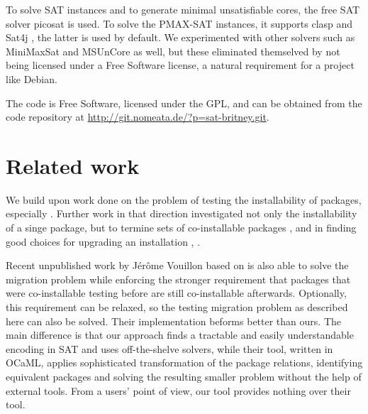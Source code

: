 \documentclass[halfparskip,11pt]{scrartcl}
\begin{document}
To solve SAT instances and to generate minimal unsatisfiable cores, the free SAT solver picosat \cite{picosat} is used. To solve the PMAX-SAT instances, it supports clasp \cite{clasp} and Sat4j \cite{sat4j}, the latter is used by default. We experimented with other solvers such as MiniMaxSat and MSUnCore as well, but these eliminated themselved by not being licensed under a Free Software license, a natural requirement for a project like Debian.


The code is Free Software, licensed under the GPL, and can be obtained from the code repository at \url{http://git.nomeata.de/?p=sat-britney.git}.

\section{Related work}

We build upon work done on the problem of testing the installability of packages, especially \cite{edos}. Further work in that direction investigated not only the installability of a singe package, but to termine sets of co-installable packages \cite{coinst}, and in finding good choices for upgrading an installation \cite{upgrade}, \cite{apt-pbo}.

Recent unpublished work by Jérôme Vouillon based on \cite{coinst} is also able to solve the migration problem while enforcing the stronger requirement that packages that were co-installable testing before are still co-installable afterwards. Optionally, this requirement can be relaxed, so the testing migration problem as described here can also be solved. Their implementation beforms better than ours. The main difference is that our approach finds a tractable and easily understandable encoding in SAT and uses off-the-shelve solvers, while their tool, written in OCaML, applies sophisticated transformation of the package relations, identifying equivalent packages and solving the resulting smaller problem without the help of external tools. From a users' point of view, our tool provides nothing over their tool.

%
%
%
\end{document}
